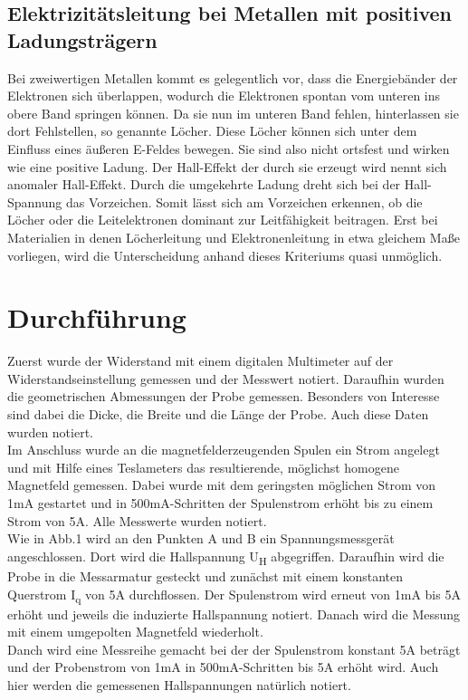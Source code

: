 \documentclass[titlepage=firstcover, captions=tableheading]{scrartcl}
\begin{document}
\subsection{Elektrizitätsleitung bei Metallen mit positiven Ladungsträgern}
Bei zweiwertigen Metallen kommt es gelegentlich vor, dass die Energiebänder der Elektronen sich überlappen, wodurch die Elektronen spontan vom unteren ins obere Band springen können. Da sie nun im unteren Band fehlen, hinterlassen sie dort Fehlstellen, so genannte Löcher. Diese Löcher können sich unter dem Einfluss eines äußeren E-Feldes bewegen. Sie sind also nicht ortsfest und wirken wie eine positive Ladung. Der Hall-Effekt der durch sie erzeugt wird nennt sich anomaler Hall-Effekt. Durch die umgekehrte Ladung dreht sich bei der Hall-Spannung das Vorzeichen. Somit lässt sich am Vorzeichen erkennen, ob die Löcher oder die Leitelektronen dominant zur Leitfähigkeit beitragen. Erst bei Materialien in denen Löcherleitung und Elektronenleitung in etwa gleichem Maße vorliegen, wird die Unterscheidung anhand dieses Kriteriums quasi unmöglich. 
\section{Durchführung}
Zuerst wurde der Widerstand mit einem digitalen Multimeter auf der Widerstandseinstellung gemessen und der Messwert notiert. Daraufhin wurden die geometrischen Abmessungen der Probe gemessen. Besonders von Interesse sind dabei die Dicke, die Breite und die Länge der Probe. Auch diese Daten wurden notiert.\\
Im Anschluss wurde an die magnetfelderzeugenden Spulen ein Strom angelegt und mit Hilfe eines Teslameters das resultierende, möglichst homogene Magnetfeld gemessen. Dabei wurde mit dem geringsten möglichen Strom von 1mA gestartet und in 500mA-Schritten der Spulenstrom erhöht bis zu einem Strom von 5A. Alle Messwerte wurden notiert.\\
Wie in Abb.1 wird an den Punkten A und B ein Spannungsmessgerät angeschlossen. Dort wird die Hallspannung U\textsubscript{H} abgegriffen. Daraufhin wird die Probe in die Messarmatur gesteckt und zunächst mit einem konstanten Querstrom I\textsubscript{q} von 5A durchflossen. Der Spulenstrom wird erneut von 1mA bis 5A erhöht und jeweils die induzierte Hallspannung notiert. Danach wird die Messung mit einem umgepolten Magnetfeld wiederholt.\\
Danch wird eine Messreihe gemacht bei der der Spulenstrom konstant 5A beträgt und der Probenstrom von 1mA in 500mA-Schritten bis 5A erhöht wird. Auch hier werden die gemessenen Hallspannungen natürlich notiert.
\end{document}
